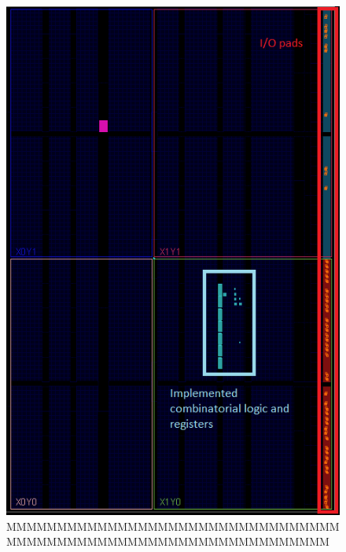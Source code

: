  \begin{figure}[H]
   \centering
   \includegraphics[width=0.5\linewidth]{./images/board}
   \caption{MMMMMMMMMMMMMMMMMMMMMMMMMMMMMMMMMMMMMMMMMMMMMMMMMMMMMMMMMMMMMMMMM}
   \label{fig:board}
 \end{figure}